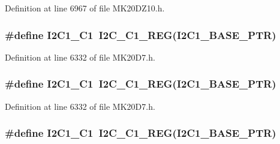Definition at line 6967 of file M\+K20\+D\+Z10.\+h.

\subsubsection[{\texorpdfstring{I2\+C1\+\_\+\+C1}{I2C1_C1}}]{\setlength{\rightskip}{0pt plus 5cm}\#define I2\+C1\+\_\+\+C1~{\bf I2\+C\+\_\+\+C1\+\_\+\+R\+EG}({\bf I2\+C1\+\_\+\+B\+A\+S\+E\+\_\+\+P\+TR})}\hypertarget{group___i2_c___register___accessor___macros_gaab6dde59f93972ca970c31a59c9f8a6b}{}\label{group___i2_c___register___accessor___macros_gaab6dde59f93972ca970c31a59c9f8a6b}


Definition at line 6332 of file M\+K20\+D7.\+h.

\subsubsection[{\texorpdfstring{I2\+C1\+\_\+\+C1}{I2C1_C1}}]{\setlength{\rightskip}{0pt plus 5cm}\#define I2\+C1\+\_\+\+C1~{\bf I2\+C\+\_\+\+C1\+\_\+\+R\+EG}({\bf I2\+C1\+\_\+\+B\+A\+S\+E\+\_\+\+P\+TR})}\hypertarget{group___i2_c___register___accessor___macros_gaab6dde59f93972ca970c31a59c9f8a6b}{}\label{group___i2_c___register___accessor___macros_gaab6dde59f93972ca970c31a59c9f8a6b}


Definition at line 6332 of file M\+K20\+D7.\+h.

\subsubsection[{\texorpdfstring{I2\+C1\+\_\+\+C1}{I2C1_C1}}]{\setlength{\rightskip}{0pt plus 5cm}\#define I2\+C1\+\_\+\+C1~{\bf I2\+C\+\_\+\+C1\+\_\+\+R\+EG}({\bf I2\+C1\+\_\+\+B\+A\+S\+E\+\_\+\+P\+TR})}\hypertarget{group___i2_c___register___accessor___macros_gaab6dde59f93972ca970c31a59c9f8a6b}{}\label{group___i2_c___register___accessor___macros_gaab6dde59f93972ca970c31a59c9f8a6b}


